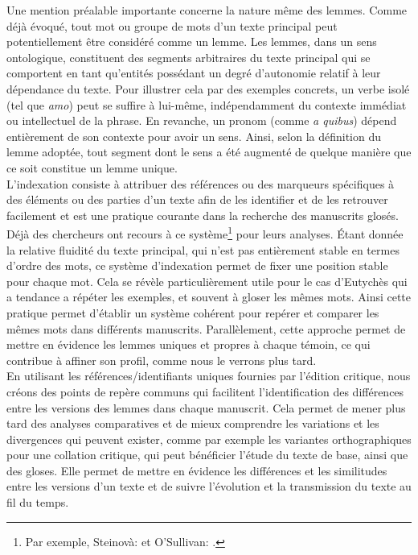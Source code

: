 \documentclass[a4paper, twoside, 12pt]{book}
\begin{document}
Une mention préalable importante concerne la nature même des lemmes. Comme déjà évoqué, tout mot ou groupe de mots d'un texte principal peut potentiellement être considéré comme un lemme. Les lemmes, dans un sens ontologique, constituent des segments arbitraires du texte principal qui se comportent en tant qu'entités possédant un degré d'autonomie relatif à leur dépendance du texte. Pour illustrer cela par des exemples concrets, un verbe isolé (tel que \textit{amo}) peut se suffire à lui-même, indépendamment du contexte immédiat ou intellectuel de la phrase. En revanche, un pronom (comme \textit{a quibus}) dépend entièrement de son contexte pour avoir un sens. Ainsi, selon la définition du lemme adoptée, tout segment dont le sens a été augmenté de quelque manière que ce soit constitue un lemme unique.\\

L'indexation consiste à attribuer des références ou des marqueurs spécifiques à des éléments ou des parties d'un texte afin de les identifier et de les retrouver facilement et est une pratique courante dans la recherche des manuscrits glosés. Déjà des chercheurs ont recours à ce système\footnote{Par exemple, Steinovà: \cite{steinova2021glosses} et O'Sullivan: \cite{oSullivanglossae}.} pour leurs analyses. Étant donnée la relative fluidité du texte principal, qui n'est pas entièrement stable en termes d'ordre des mots, ce système d'indexation permet de fixer une position stable pour chaque mot. Cela se révèle particulièrement utile pour le cas d'Eutychès qui a tendance a répéter les exemples, et souvent à gloser les mêmes mots. Ainsi cette pratique permet d'établir un système cohérent pour repérer et comparer les mêmes mots dans différents manuscrits. Parallèlement, cette approche permet de mettre en évidence les lemmes uniques et propres à chaque témoin, ce qui contribue à affiner son profil, comme nous le verrons plus tard.\\

En utilisant les références/identifiants uniques fournies par l'édition critique, nous créons des points de repère communs qui facilitent l'identification des différences entre les versions des lemmes dans chaque manuscrit. Cela permet de mener plus tard des analyses comparatives et de mieux comprendre les variations et les divergences qui peuvent exister, comme par exemple les variantes orthographiques pour une collation critique, qui peut bénéficier l'étude du texte de base, ainsi que des gloses.
Elle permet de mettre en évidence les différences et les similitudes entre les versions d'un texte et de suivre l'évolution et la transmission du texte au fil du temps.\\
\end{document}
